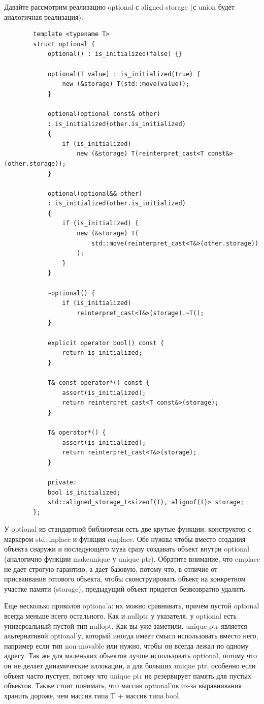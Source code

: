 \documentclass[12pt, a4paper]{article}
\begin{document}
	Давайте рассмотрим реализацию optional с aligned storage (с union будет аналогичная реализация):
	\begin{verbatim}
		template <typename T>
		struct optional {
			optional() : is_initialized(false) {}
			
			optional(T value) : is_initialized(true) {
				new (&storage) T(std::move(value));
			}
			
			optional(optional const& other)
			: is_initialized(other.is_initialized)
			{
				if (is_initialized)
					new (&storage) T(reinterpret_cast<T const&>(other.storage));
			}
			
			optional(optional&& other)
			: is_initialized(other.is_initialized)
			{
				if (is_initialized) {
					new (&storage) T(
						std::move(reinterpret_cast<T&>(other.storage))
					);
				}
			}
			
			~optional() {
				if (is_initialized)
					reinterpret_cast<T&>(storage).~T();
			}
			
			explicit operator bool() const {
				return is_initialized;
			}
			
			T& const operator*() const {
				assert(is_initialized);
				return reinterpret_cast<T const&>(storage);
			}
			
			T& operator*() {
				assert(is_initialized);
				return reinterpret_cast<T&>(storage);
			}
			
			private:
			bool is_initialized;
			std::aligned_storage_t<sizeof(T), alignof(T)> storage;
		};
	\end{verbatim}
	У optional из стандартной библиотеки есть две крутые функции: конструктор с маркером std::in\textunderscore place и функция emplace. Обе нужны чтобы вместо создания объекта снаружи и последующего мува сразу создавать объект внутри optional (аналогично функции make\textunderscore unique у unique ptr). Обратите внимание, что emplace не дает строгую гарантию, а дает базовую, потому что, в отличие от присваивания готового объекта, чтобы сконструировать объект на конкретном участке памяти (storage), предыдущий объект придется безвозвратно удалить.
	\par Еще несколько приколов optiona'a: их можно сравнивать, причем пустой optional всегда меньше всего остального. Как и nullptr у указателя, у optional есть универсальный пустой тип nullopt. Как вы уже заметили, unique ptr является альтернативой optional'у, который иногда имеет смысл использовать вместо него, например если тип non-movable или нужно, чтобы он всегда лежал по одному адресу. Так же для маленьких объектов лучше использовать optional, потому что он не делает динамические аллокации, а для больших unique ptr, особенно если объект часто пустует, потому что unique ptr не резервирует память для пустых объектов. Также стоит понимать, что массив optional'ов из-за выравнивания хранить дороже, чем массив типа T + массив типа bool.
\end{document}
